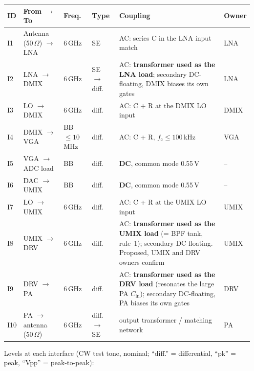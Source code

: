 \par\medskip\noindent\small
\begin{tabularx}{\textwidth}{@{}l l l l L l@{}}
	\toprule
	\textbf{ID} & \textbf{From $\to$ To} & \textbf{Freq.} & \textbf{Type} & \textbf{Coupling} & \textbf{Owner} \\
	\midrule
	I1 & Antenna (50\,$\Omega$) $\to$ LNA & 6\,GHz & SE & AC: series C in the LNA input match & LNA \\
	I2 & LNA $\to$ DMIX & 6\,GHz & SE $\to$ diff. & AC: \textbf{transformer used as the LNA load}; secondary DC-floating, DMIX biases its own gates & LNA \\
	I3 & LO $\to$ DMIX & 6\,GHz & diff. & AC: C + R at the DMIX LO input & DMIX \\
	I4 & DMIX $\to$ VGA & BB $\leq 10$\,MHz & diff. & AC: C + R, $f_\mathrm{c} \leq 100$\,kHz & VGA \\
	I5 & VGA $\to$ ADC load & BB & diff. & \textbf{DC}, common mode 0.55\,V & -- \\
	I6 & DAC $\to$ UMIX & BB & diff. & \textbf{DC}, common mode 0.55\,V & -- \\
	I7 & LO $\to$ UMIX & 6\,GHz & diff. & AC: C + R at the UMIX LO input & UMIX \\
	I8 & UMIX $\to$ DRV & 6\,GHz & diff. & AC: \textbf{transformer used as the UMIX load} (= BPF tank, rule~1); secondary DC-floating. Proposed, UMIX and DRV owners confirm & UMIX \\
	I9 & DRV $\to$ PA & 6\,GHz & diff. & AC: \textbf{transformer used as the DRV load} (resonates the large PA $C_\mathrm{in}$); secondary DC-floating, PA biases its own gates & DRV \\
	I10 & PA $\to$ antenna (50\,$\Omega$) & 6\,GHz & diff. $\to$ SE & output transformer / matching network & PA \\
	\bottomrule
\end{tabularx}\par\normalsize

\medskip
\noindent Levels at each interface (CW test tone, nominal; ``diff.'' = differential,
``pk'' = peak, ``Vpp'' = peak-to-peak):

